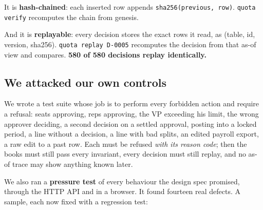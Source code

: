 \documentclass[10pt,a4paper]{article}
\newcommand{\gy}[1]{{\color{qgrey}#1}}
\newcommand{\code}[1]{{\small\texttt{#1}}}
\begin{document}
It is \textbf{hash-chained}: each inserted row appends \code{sha256(previous, row)}. \code{quota verify} recomputes the chain from genesis.

And it is \textbf{replayable}: every decision stores the exact rows it read, as \gy{(table, id, version, sha256)}. \code{quota replay D-0005} recomputes the decision from that as-of view and compares. \textbf{580 of 580 decisions replay identically.}

\subsection{We attacked our own controls}

We wrote a test suite whose job is to perform every forbidden action and require a refusal: seats approving, reps approving, the VP exceeding his limit, the wrong approver deciding, a second decision on a settled approval, posting into a locked period, a line without a decision, a line with bad splits, an edited payroll export, a raw edit to a past row. Each must be refused \emph{with its reason code}; then the books must still pass every invariant, every decision must still replay, and no as-of trace may show anything known later.

We also ran a \textbf{pressure test} of every behaviour the design spec promised, through the HTTP API and in a browser. It found fourteen real defects. A sample, each now fixed with a regression test:
\end{document}
